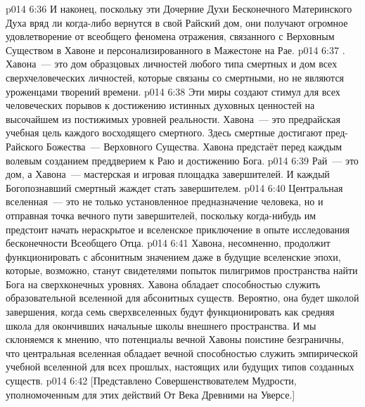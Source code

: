 \vs p014 6:36 И наконец, поскольку эти Дочерние Духи Бесконечного Материнского Духа вряд ли когда\hyp{}либо вернутся в свой Райский дом, они получают огромное удовлетворение от всеобщего феномена отражения, связанного с Верховным Существом в Хавоне и персонализированного в Мажестоне на Рае.
\vs p014 6:37 . Хавона~--- это дом образцовых личностей любого типа смертных и дом всех сверхчеловеческих личностей, которые связаны со смертными, но не являются уроженцами творений времени.
\vs p014 6:38 Эти миры создают стимул для всех человеческих порывов к достижению истинных духовных ценностей на высочайшем из постижимых уровней реальности. Хавона~--- это предрайская учебная цель каждого восходящего смертного. Здесь смертные достигают пред\hyp{}Райского Божества~--- Верховного Существа. Хавона предстаёт перед каждым волевым созданием преддверием к Раю и достижению Бога.
\vs p014 6:39 Рай~--- это дом, а Хавона~--- мастерская и игровая площадка завершителей. И каждый Богопознавший смертный жаждет стать завершителем.
\vs p014 6:40 Центральная вселенная~--- это не только установленное предназначение человека, но и отправная точка вечного пути завершителей, поскольку когда\hyp{}нибудь им предстоит начать нераскрытое и вселенское приключение в опыте исследования бесконечности Всеобщего Отца.
\vs p014 6:41 \pc Хавона, несомненно, продолжит функционировать с абсонитным значением даже в будущие вселенские эпохи, которые, возможно, станут свидетелями попыток пилигримов пространства найти Бога на сверхконечных уровнях. Хавона обладает способностью служить образовательной вселенной для абсонитных существ. Вероятно, она будет школой завершения, когда семь сверхвселенных будут функционировать как средняя школа для окончивших начальные школы внешнего пространства. И мы склоняемся к мнению, что потенциалы вечной Хавоны поистине безграничны, что центральная вселенная обладает вечной способностью служить эмпирической учебной вселенной для всех прошлых, настоящих или будущих типов созданных существ.
\vsetoff
\vs p014 6:42 [Представлено Совершенствователем Мудрости, уполномоченным для этих действий От Века Древними на Уверсе.]
\quizlink
